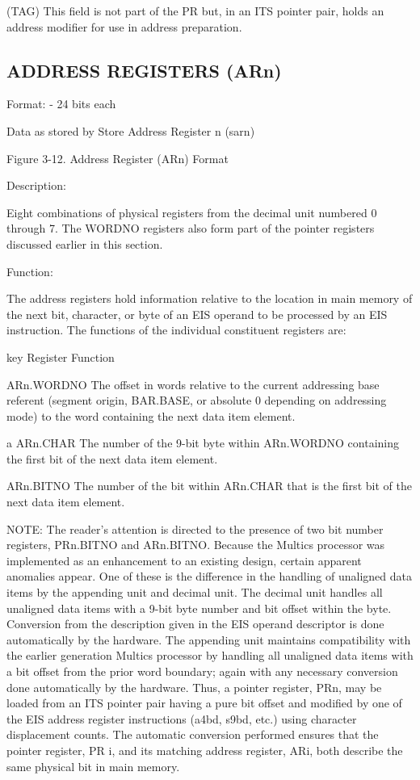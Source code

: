 (TAG) This field is not part of the PR but, in an ITS pointer pair, holds an
address modifier for use in address preparation.

\subsection{ADDRESS REGISTERS (ARn)}

Format: - 24 bits each

Data as stored by Store Address Register n (sarn)

Figure 3-12. Address Register (ARn) Format

Description:

Eight combinations of physical registers from the decimal unit numbered 0
through 7. The WORDNO registers also form part of the pointer registers
discussed earlier in this section.

Function:

The address registers hold information relative to the location in main memory
of the next bit, character, or byte of an EIS operand to be processed by an EIS
instruction. The functions of the individual constituent registers are:

key Register Function

ARn.WORDNO The offset in words relative to the current addressing base referent
(segment origin, BAR.BASE, or absolute 0 depending on addressing mode) to the
word containing the next data item element.

a ARn.CHAR The number of the 9-bit byte within ARn.WORDNO containing the first
bit of the next data item element.

ARn.BITNO The number of the bit within ARn.CHAR that is the first bit of the
next data item element.

NOTE: The reader's attention is directed to the presence of two bit number
registers, PRn.BITNO and ARn.BITNO. Because the Multics processor was
implemented as an enhancement to an existing design, certain apparent anomalies
appear. One of these is the difference in the handling of unaligned data items
by the appending unit and decimal unit. The decimal unit handles all unaligned
data items with a 9-bit byte number and bit offset within the byte. Conversion
from the description given in the EIS operand descriptor is done automatically
by the hardware. The appending unit maintains compatibility with the earlier
generation Multics processor by handling all unaligned data items with a bit
offset from the prior word boundary; again with any necessary conversion done
automatically by the hardware. Thus, a pointer register, PRn, may be loaded
from an ITS pointer pair having a pure bit offset and modified by one of the
EIS address register instructions (a4bd, s9bd, etc.) using character
displacement counts.  The automatic conversion performed ensures that the
pointer register, PR i, and its matching address register, ARi, both describe
the same physical bit in main memory.


